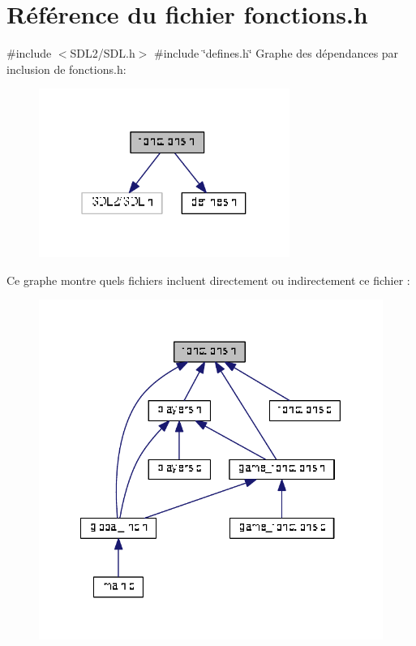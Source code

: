 \section{Référence du fichier fonctions.\+h}
\label{fonctions_8h}
{\ttfamily \#include $<$S\+D\+L2/\+S\+D\+L.\+h$>$}\newline
{\ttfamily \#include \char`\"{}defines.\+h\char`\"{}}\newline
Graphe des dépendances par inclusion de fonctions.\+h\+:
\nopagebreak
\begin{figure}[H]
\begin{center}
\leavevmode
\includegraphics[width=232pt]{fonctions_8h__incl}
\end{center}
\end{figure}
Ce graphe montre quels fichiers incluent directement ou indirectement ce fichier \+:
\nopagebreak
\begin{figure}[H]
\begin{center}
\leavevmode
\includegraphics[width=328pt]{fonctions_8h__dep__incl}
\end{center}
\end{figure}
